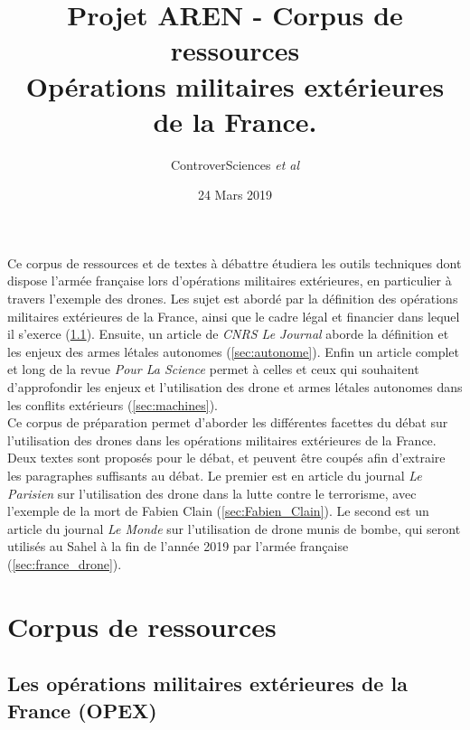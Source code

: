 \documentclass[8pt]{article}
\author{ControverSciences\textit{ et al} }
\title{Projet AREN - Corpus de ressources \\   Opérations militaires extérieures de la France.}
\date{24 Mars 2019}
\begin{document}
\maketitle

Ce corpus de ressources et de textes à débattre étudiera les outils techniques dont dispose l’armée française lors d'opérations militaires extérieures, en particulier à travers l'exemple des drones. Les sujet est abordé par la définition des opérations militaires extérieures de la France, ainsi que le cadre légal et financier dans lequel il s'exerce (\ref{sec:definition}). Ensuite, un article de \textit{CNRS Le Journal} aborde la définition et les enjeux des armes létales autonomes (\ref{sec:autonome}). Enfin un article complet et long de la revue \textit{Pour La Science} permet à celles et ceux qui souhaitent d'approfondir les enjeux et l'utilisation des drone et armes létales autonomes dans les conflits extérieurs (\ref{sec:machines}).\\


Ce corpus de préparation permet d'aborder les différentes facettes du débat sur l'utilisation des drones dans les opérations militaires extérieures de la France. Deux textes sont proposés pour le débat, et peuvent être coupés afin d'extraire les paragraphes suffisants au débat. Le premier est en article du journal \textit{Le Parisien} sur l'utilisation des drone dans la lutte contre le terrorisme, avec l'exemple de la mort de Fabien Clain (\ref{sec:Fabien_Clain}). Le second est un article du journal \textit{Le Monde} sur l'utilisation de drone munis de bombe, qui seront utilisés au Sahel à la fin de l’année 2019 par l'armée française (\ref{sec:france_drone}). 

\tableofcontents
\newpage
\section{Corpus de ressources}
\subsection{Les opérations militaires extérieures de la France (OPEX)}
\label{sec:definition}
\end{document}
